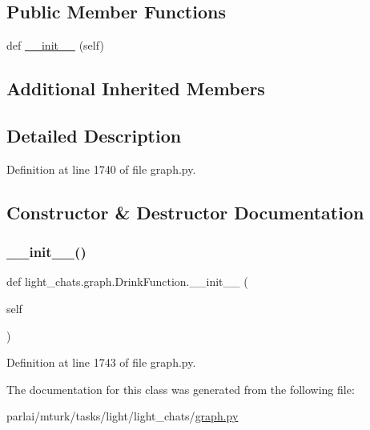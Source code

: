 \subsection*{Public Member Functions}
\begin{DoxyCompactItemize}
\item 
def \hyperlink{classlight__chats_1_1graph_1_1DrinkFunction_ab7c7036ff0885b5263458d0a75d5d878}{\+\_\+\+\_\+init\+\_\+\+\_\+} (self)
\end{DoxyCompactItemize}
\subsection*{Additional Inherited Members}


\subsection{Detailed Description}
\begin{DoxyVerb}\end{DoxyVerb}
 

Definition at line 1740 of file graph.\+py.



\subsection{Constructor \& Destructor Documentation}
\mbox{\label{classlight__chats_1_1graph_1_1DrinkFunction_ab7c7036ff0885b5263458d0a75d5d878}} 
\subsubsection{\texorpdfstring{\+\_\+\+\_\+init\+\_\+\+\_\+()}{\_\_init\_\_()}}
{\footnotesize\ttfamily def light\+\_\+chats.\+graph.\+Drink\+Function.\+\_\+\+\_\+init\+\_\+\+\_\+ (\begin{DoxyParamCaption}\item[{}]{self }\end{DoxyParamCaption})}



Definition at line 1743 of file graph.\+py.



The documentation for this class was generated from the following file\+:\begin{DoxyCompactItemize}
\item 
parlai/mturk/tasks/light/light\+\_\+chats/\hyperlink{parlai_2mturk_2tasks_2light_2light__chats_2graph_8py}{graph.\+py}\end{DoxyCompactItemize}
